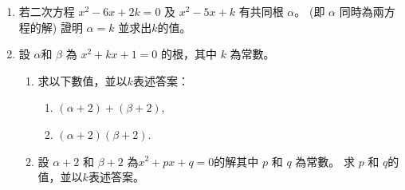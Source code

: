 \documentclass[11pt]{article}
\begin{document}
\begin{enumerate}
            \hrulefill
            
            \hrulefill
            
            \hrulefill
            
            \hrulefill
            
            \hrulefill
            
            \hrulefill
            
            \hrulefill
            
            \hrulefill
            
            \hrulefill

        \item 若二次方程 $x^2-6x+2k=0$ 及 $x^2-5x+k$ 有共同根 $\alpha$。 (即 $\alpha$ 同時為兩方程的解) 證明 $\alpha=k$ 並求出$k$的值。
        
        \hrulefill

            \hrulefill
            
            \hrulefill
            
            \hrulefill
            
            \hrulefill
            
            \hrulefill
            
            \hrulefill
            
            \hrulefill
            
            \hrulefill
            
            \hrulefill
            
            \hrulefill
            
            \hrulefill

        \pagebreak
        \item 設 $\alpha$和 $\beta$ 為 $x^2+kx+1=0$ 的根，其中 $k$ 為常數。\begin{enumerate}
            \item 求以下數值，並以$k$表述答案：\begin{enumerate}
                \item $(\alpha+2)+(\beta+2)$,
                \item $(\alpha+2)(\beta+2)$.
            \end{enumerate}
            \item 設 $\alpha+2$ 和 $\beta+2$ 為$x^2+px+q=0$的解其中 $p$ 和 $q$ 為常數。 求 $p$ 和 $q$的值，並以$k$表述答案。
        \end{enumerate}


\end{enumerate}
\end{document}
